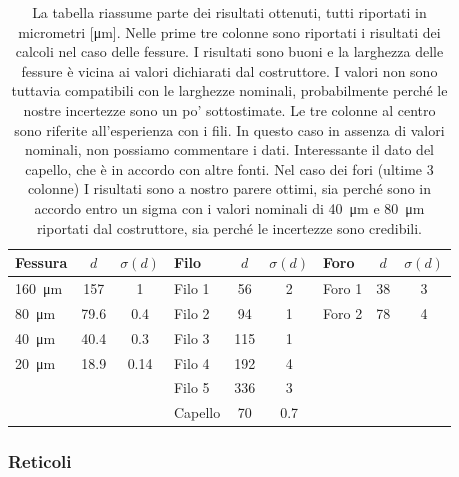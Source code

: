 \begin{table}[t!]
    \centering
    \footnotesize
    \begin{tabular}{l | c c || l | c c || l | c c }
        \toprule
        Fessura & $d$ & $\sigma(d)$ & Filo & $d$ & $\sigma(d)$ & Foro & $d$ & $\sigma(d)$ \\
        \midrule
        \SI{160}{\micro\metre} & 157  & 1    & Filo 1  & 56    &   2   & Foro 1 & 38 & 3 \\
        \SI{80}{\micro\metre}  & 79.6 & 0.4  & Filo 2  & 94    &   1   & Foro 2 & 78 & 4 \\
        \SI{40}{\micro\metre}  & 40.4 & 0.3  & Filo 3  & 115   &   1   &        &    &   \\
        \SI{20}{\micro\metre}  & 18.9 & 0.14 & Filo 4  & 192   &   4   &        &    &   \\
                               &      &      & Filo 5  & 336   &   3   &        &    &   \\
                               &      &      & Capello & 70    &   0.7 &        &    &   \\
        \bottomrule
    \end{tabular}
    \caption{La tabella riassume parte dei risultati ottenuti, tutti riportati in micrometri [\si{\micro\metre}].
    Nelle prime tre colonne sono riportati i risultati dei calcoli
    nel caso delle fessure. I risultati sono buoni e la larghezza delle fessure è vicina ai valori dichiarati dal costruttore.
    I valori non sono tuttavia compatibili con le larghezze nominali, probabilmente perché le nostre incertezze sono un po' sottostimate.
    Le tre colonne al centro sono riferite all'esperienza con i fili. In questo caso in assenza di valori nominali, non possiamo
    commentare i dati. Interessante il dato del capello, che è in accordo con altre fonti. Nel caso dei fori (ultime 3 colonne)
    I risultati sono a nostro parere ottimi, sia perché sono in accordo entro un sigma con i valori nominali di \SI{40}{\micro\metre} e
    \SI{80}{\micro\metre} riportati dal costruttore, sia perché le incertezze sono credibili.}
    \label{tab:ost}
\end{table}

\subsubsection{Reticoli}

